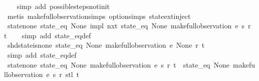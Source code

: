 \begin{isabellebody}
\ \ \isamarkupfalse%
\ {\isacharparenleft}simp\ add{\isacharcolon}\ possible{\isacharunderscore}steps{\isacharunderscore}not{\isacharunderscore}init{\isacharparenright}\isanewline
\ \ \isamarkupfalse%
\ {\isacharparenleft}metis\ make{\isacharunderscore}full{\isacharunderscore}observation{\isachardot}simps{\isacharparenleft}{}{\isacharparenright}\ option{\isachardot}simps{\isacharparenleft}{}{\isacharparenright}\ state{\isachardot}ext{\isacharunderscore}inject{\isacharparenright}%
\endisatagproof
{\isafoldproof}%
%
\isadelimproof
\isanewline
%
\endisadelimproof
\isanewline
{}\isamarkupfalse%
\ state{\isacharunderscore}none{\isacharcolon}\ {\isachardoublequoteopen}{\isacharparenleft}{\isacharparenleft}state_eq\ None{\isacharparenright}\ impl\ nxt\ {\isacharparenleft}state_eq\ None{\isacharparenright}{\isacharparenright}\ {\isacharparenleft}make{\isacharunderscore}full{\isacharunderscore}observation\ e\ s\ r\ t{\isacharparenright}{\isachardoublequoteclose}\isanewline
%
\isadelimproof
\ \ %
\endisadelimproof
%
\isatagproof
{}\isamarkupfalse%
\ {\isacharparenleft}simp\ add{\isacharcolon}\ state_eq{\isacharunderscore}def{\isacharparenright}%
\endisatagproof
{\isafoldproof}%
%
\isadelimproof
\isanewline
%
\endisadelimproof
\isanewline
{}\isamarkupfalse%
\ shd{\isacharunderscore}state{\isacharunderscore}is{\isacharunderscore}none{\isacharcolon}\ {\isachardoublequoteopen}{\isacharparenleft}state_eq\ None{\isacharparenright}\ {\isacharparenleft}make{\isacharunderscore}full{\isacharunderscore}observation\ e\ None\ r\ t{\isacharparenright}{\isachardoublequoteclose}\isanewline
%
\isadelimproof
\ \ %
\endisadelimproof
%
\isatagproof
{}\isamarkupfalse%
\ {\isacharparenleft}simp\ add{\isacharcolon}\ state_eq{\isacharunderscore}def{\isacharparenright}%
\endisatagproof
{\isafoldproof}%
%
\isadelimproof
\isanewline
%
\endisadelimproof
\isanewline
{}\isamarkupfalse%
\ state{\isacharunderscore}none{\isacharunderscore}{}{\isacharcolon}\ {\isachardoublequoteopen}{\isacharparenleft}state_eq\ None{\isacharparenright}\ {\isacharparenleft}make{\isacharunderscore}full{\isacharunderscore}observation\ e\ s\ r\ t{\isacharparenright}\ {\isasymLongrightarrow}\ {\isacharparenleft}state_eq\ None{\isacharparenright}\ {\isacharparenleft}make{\isacharunderscore}full{\isacharunderscore}observation\ e\ s\ r\ {\isacharparenleft}stl\ t{\isacharparenright}{\isacharparenright}{\isachardoublequoteclose}\isanewline
%
\isadelimproof
\ \ %
\endisadelimproof
%
\isatagproof

\end{isabellebody}
